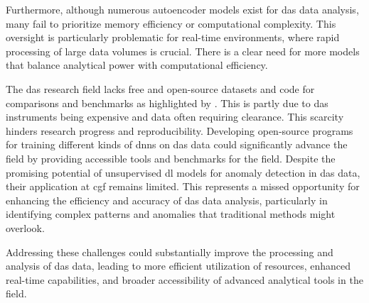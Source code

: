 Furthermore, although numerous autoencoder models exist for \acrshort{das} data analysis, many fail to prioritize memory efficiency or computational complexity. This oversight is particularly problematic for real-time environments, where rapid processing of large data volumes is crucial. There is a clear need for more models that balance analytical power with computational efficiency. 

The \acrshort{das} research field lacks free and open-source datasets and code for comparisons and benchmarks as highlighted by \cite{spica2022pubdas}. This is partly due to \acrshort{das} instruments being expensive and data often requiring clearance. This scarcity hinders research progress and reproducibility. Developing open-source programs for training different kinds of \acrshort{dnn}s on \acrshort{das} data could significantly advance the field by providing accessible tools and benchmarks for the field. Despite the promising potential of unsupervised \acrshort{dl} models for anomaly detection in \acrshort{das} data, their application at \acrshort{cgf} remains limited. This represents a missed opportunity for enhancing the efficiency and accuracy of \acrshort{das} data analysis, particularly in identifying complex patterns and anomalies that traditional methods might overlook.

Addressing these challenges could substantially improve the processing and analysis of \acrshort{das} data, leading to more efficient utilization of resources, enhanced real-time capabilities, and broader accessibility of advanced analytical tools in the field. 


